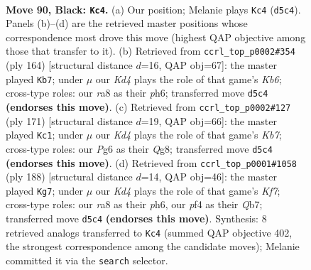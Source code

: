 \documentclass[11pt]{article}
\begin{document}
\clearpage

\begin{figure}[p]\centering
\begin{subfigure}{0.46\textwidth}\centering
\resizebox{\linewidth}{!}{%
\newchessgame
\chessboard[
  setfen={R7/8/6p1/3k1p2/5P2/8/3Q2K1/8 b - - 0 90},
  showmover=false,
  pgfstyle=straightmove, color=movearrow, markmove={d5-c4}
]}
\caption{}
\end{subfigure}\hfill
\begin{subfigure}{0.46\textwidth}\centering
\resizebox{\linewidth}{!}{%
\newchessgame
\chessboard[
  setfen={6k1/8/1K5p/6p1/6P1/4q2P/2Q5/8 w - - 15 83},
  showmover=false,
  pgfstyle=straightmove, color=movearrow, markmove={b6-b7}
]}
\caption{}
\end{subfigure}
\\[4pt]
\begin{subfigure}{0.46\textwidth}\centering
\resizebox{\linewidth}{!}{%
\newchessgame
\chessboard[
  setfen={6q1/3K4/7P/pQ6/8/8/1k6/8 b - - 21 86},
  showmover=false,
  pgfstyle=straightmove, color=movearrow, markmove={b2-c1}
]}
\caption{}
\end{subfigure}\hfill
\begin{subfigure}{0.46\textwidth}\centering
\resizebox{\linewidth}{!}{%
\newchessgame
\chessboard[
  setfen={8/1QP2K2/7p/2k2q2/5p2/8/8/8 w - - 3 95},
  showmover=false,
  pgfstyle=straightmove, color=movearrow, markmove={f7-g7}
]}
\caption{}
\end{subfigure}
\caption{\textbf{Move 90, Black: \texttt{Kc4}.} (a) Our position; Melanie plays \texttt{Kc4} (\texttt{d5c4}). Panels (b)--(d) are the retrieved master positions whose correspondence most drove this move (highest QAP objective among those that transfer to it). (b) Retrieved from \texttt{ccrl\_top\_p0002\#354} (ply 164) [structural distance $d$=16, QAP obj=67]: the master played \texttt{Kb7}; under $\mu$ our \emph{Kd4} plays the role of that game's \emph{Kb6}; cross-type roles: our \emph{r}a8 as their \emph{p}h6; transferred move \texttt{d5c4} \textbf{(endorses this move)}. (c) Retrieved from \texttt{ccrl\_top\_p0002\#127} (ply 171) [structural distance $d$=19, QAP obj=66]: the master played \texttt{Kc1}; under $\mu$ our \emph{Kd4} plays the role of that game's \emph{Kb7}; cross-type roles: our \emph{P}g6 as their \emph{Q}g8; transferred move \texttt{d5c4} \textbf{(endorses this move)}. (d) Retrieved from \texttt{ccrl\_top\_p0001\#1058} (ply 188) [structural distance $d$=14, QAP obj=46]: the master played \texttt{Kg7}; under $\mu$ our \emph{Kd4} plays the role of that game's \emph{Kf7}; cross-type roles: our \emph{r}a8 as their \emph{p}h6, our \emph{p}f4 as their \emph{Q}b7; transferred move \texttt{d5c4} \textbf{(endorses this move)}. Synthesis: 8 retrieved analogs transferred to \texttt{Kc4} (summed QAP objective 402, the strongest correspondence among the candidate moves); Melanie committed it via the \texttt{search} selector.}
\label{fig:thought-m179}
\end{figure}
\end{document}
